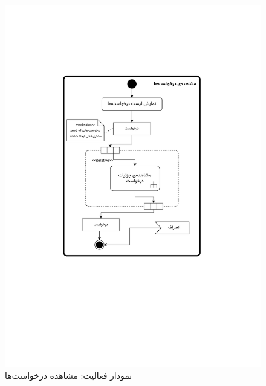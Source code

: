 \begin{figure}[ht!]
	\centering
	\includegraphics[scale=0.8, page=1]{figs/OOD-activity11-20.pdf}
	\caption{نمودار فعالیت: مشاهده درخواست‌ها}
\end{figure}
\FloatBarrier
\newpage

